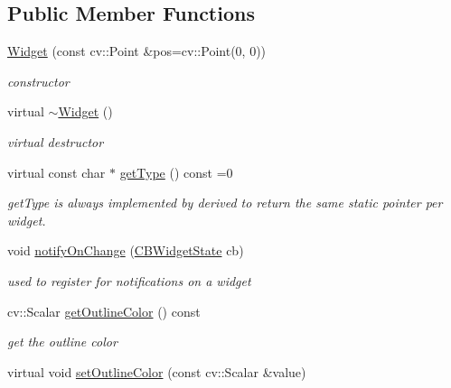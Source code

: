 \subsection*{Public Member Functions}
\begin{DoxyCompactItemize}
\item 
\hyperlink{classcanvascv_1_1Widget_a1879deafb7cb8ad80e2262568ef2bde1}{Widget} (const cv\+::\+Point \&pos=cv\+::\+Point(0, 0))\hypertarget{classcanvascv_1_1Widget_a1879deafb7cb8ad80e2262568ef2bde1}{}\label{classcanvascv_1_1Widget_a1879deafb7cb8ad80e2262568ef2bde1}

\begin{DoxyCompactList}\small\item\em constructor \end{DoxyCompactList}\item 
virtual \hyperlink{classcanvascv_1_1Widget_abaa2a6266a947194fe240e9385cfaa6f}{$\sim$\+Widget} ()\hypertarget{classcanvascv_1_1Widget_abaa2a6266a947194fe240e9385cfaa6f}{}\label{classcanvascv_1_1Widget_abaa2a6266a947194fe240e9385cfaa6f}

\begin{DoxyCompactList}\small\item\em virtual destructor \end{DoxyCompactList}\item 
virtual const char $\ast$ \hyperlink{classcanvascv_1_1Widget_a85884269bd53ab91203f099a586efa43}{get\+Type} () const =0
\begin{DoxyCompactList}\small\item\em get\+Type is always implemented by derived to return the same static pointer per widget. \end{DoxyCompactList}\item 
void \hyperlink{classcanvascv_1_1Widget_abdb1aed0ca76845ba6a56c4f8db502c9}{notify\+On\+Change} (\hyperlink{classcanvascv_1_1Widget_a410a6951e3d1f30b87702577a389d937}{C\+B\+Widget\+State} cb)
\begin{DoxyCompactList}\small\item\em used to register for notifications on a widget \end{DoxyCompactList}\item 
cv\+::\+Scalar \hyperlink{classcanvascv_1_1Widget_aadbc81d960f158f2e3c8e0d96167408e}{get\+Outline\+Color} () const \hypertarget{classcanvascv_1_1Widget_aadbc81d960f158f2e3c8e0d96167408e}{}\label{classcanvascv_1_1Widget_aadbc81d960f158f2e3c8e0d96167408e}

\begin{DoxyCompactList}\small\item\em get the outline color \end{DoxyCompactList}\item 
virtual void \hyperlink{classcanvascv_1_1Widget_a6e79b6a861cfb54fea56d5705fec44d7}{set\+Outline\+Color} (const cv\+::\+Scalar \&value)\hypertarget{classcanvascv_1_1Widget_a6e79b6a861cfb54fea56d5705fec44d7}{}\label{classcanvascv_1_1Widget_a6e79b6a861cfb54fea56d5705fec44d7}


\end{DoxyCompactItemize}
